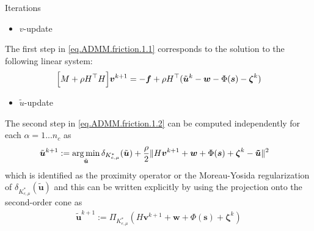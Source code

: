 \documentclass[8pt,red]{beamer}
\theoremstyle{plain}
\theoremstyle{definition}
\theoremstyle{remark}
\newcommand{\argmin}{\operatornamewithlimits{\mathrm{arg\,min}}}
\newcommand{\bi}[1]{\ensuremath{\boldsymbol{#1}}}
\begin{document}
\begin{frame}{Iterations}

\begin{itemize}
\item $v$-update
\end{itemize}
The first step in \eqref{eq.ADMM.friction.1.1} corresponds to the solution to the following linear system: 
\begin{align}
  \Bigl[ M + 
  \rho H^{\top} H \Bigr] \bi{v}^{k+1} 
  = -\bi{f} 
  + \rho H^{\top} (\tilde{\bi{u}}^k - \bi{w} - \Phi(\bi{s}) - \bi{\zeta}^k)   \label{eq.ADMM.friction.2.1}
\end{align}

\begin{itemize}
\item $\tilde{u}$-update
\end{itemize}
The second step in \eqref{eq.ADMM.friction.1.2} can be computed independently for each $\alpha = 1 ... n_{c}$ as 
\begin{align}
  \tilde{\bi{u}}^{k+1}
  &:= \argmin_{\tilde{\bi{u}}} 
    \delta_{K_{e,\mu}^{*}}(\tilde{\bi{u}}) 
    + \frac{\rho}{2} 
    \| H \bi{v}^{k+1} + \bi{w} + \Phi(\bi{s}) + \bi{\zeta}^{k} - \bi{\tilde u} \|^{2}
  \label{eq.ADMM.friction.2.2}
\end{align}
which is identified as the proximity operator or the Moreau-Yosida regularization of $\delta_{K_{e,\mu}^{*}}(\tilde{\bi{u}})$ and this can be written explicitly by using the projection onto the second-order cone as
\begin{align}
  \tilde{\bi{u}}^{k+1} := \Pi_{K_{e,\mu}^{*}}(H \bi{v}^{k+1} + \bi{w} + \Phi(\bi{s}) + \bi{\zeta}^{k})
  \label{eq.ADMM.friction.2.2bi}
\end{align}

\end{frame}

%
\end{document}
